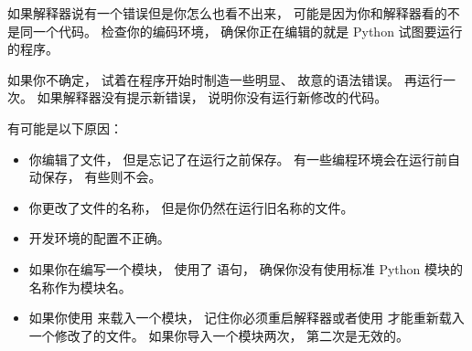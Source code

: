 如果解释器说有一个错误但是你怎么也看不出来， 可能是因为你和解释器看的不是同一个代码。  
检查你的编码环境， 确保你正在编辑的就是 Python 试图要运行的程序。


如果你不确定， 试着在程序开始时制造一些明显、 故意的语法错误。  
再运行一次。  如果解释器没有提示新错误， 说明你没有运行新修改的代码。


有可能是以下原因：

\begin{itemize}


\item 你编辑了文件， 但是忘记了在运行之前保存。  有一些编程环境会在运行前自动保存， 有些则不会。


\item 你更改了文件的名称， 但是你仍然在运行旧名称的文件。


\item 开发环境的配置不正确。


\item 如果你在编写一个模块， 使用了  语句， 确保你没有使用标准 Python 模块的名称作为模块名。


\item 如果你使用  来载入一个模块， 记住你必须重启解释器或者使用  才能重新载入一个修改了的文件。  如果你导入一个模块两次， 第二次是无效的。

\end{itemize}

